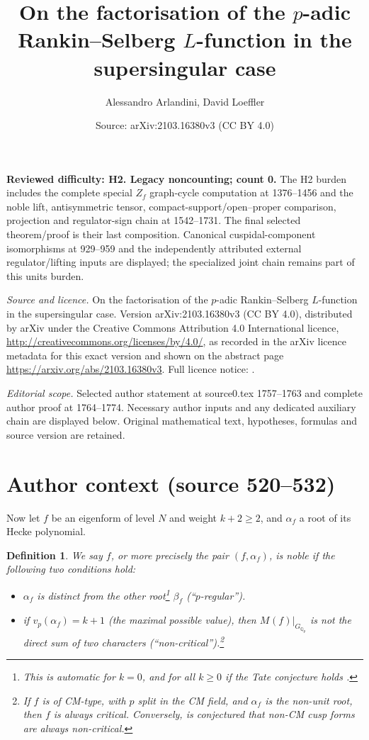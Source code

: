 \documentclass[10pt,a4paper]{amsart}
\title[Author proof 109730]{On the factorisation of the \texorpdfstring{$p$}{p}-adic Rankin--Selberg \texorpdfstring{$L$}{L}-function in the supersingular case}
\author{Alessandro Arlandini, David Loeffler}
\date{Source: arXiv:2103.16380v3 (CC BY 4.0)}
\newcommand{\Q}{\numberset{Q}}
\DeclareMathOperator{\et}{\acute{e}t}
\renewcommand{\ge}{\geqslant}
\newcommand{\numberset}{\mathbb}
\newtheorem{definition}{Definition}
\begin{document}
\maketitle
\noindent\textbf{Reviewed difficulty: H2. Legacy noncounting; count 0.} The H2 burden includes the complete special $Z_f$ graph-cycle computation at 1376--1456 and the noble lift, antisymmetric tensor, compact-support/open--proper comparison, projection and regulator-sign chain at 1542--1731. The final selected theorem/proof is their last composition. Canonical cuspidal-component isomorphisms at 929--959 and the independently attributed external regulator/lifting inputs are displayed; the specialized joint chain remains part of this unit\textquotesingle s burden.\par\medskip

\noindent\emph{Source and licence.} On the factorisation of the \texorpdfstring{$p$}{p}-adic Rankin--Selberg \texorpdfstring{$L$}{L}-function in the supersingular case. Version arXiv:2103.16380v3 (CC BY 4.0), distributed by arXiv under the Creative Commons Attribution 4.0 International licence, \url{http://creativecommons.org/licenses/by/4.0/}, as recorded in the arXiv licence metadata for this exact version and shown on the abstract page \url{https://arxiv.org/abs/2103.16380v3}. Full licence notice: .\par\smallskip


\noindent\textit{Editorial scope.} Selected author statement at source0.tex 1757--1763 and complete author proof at 1764--1774. Necessary author inputs and any dedicated auxiliary chain are displayed below. Original mathematical text, hypotheses, formulas and source version are retained.\par\smallskip
\section*{Author context (source 520--532)}
  Now let $f$ be an eigenform of level $N$ and weight $k + 2 \ge 2$, and $\alpha_f$ a root of its Hecke polynomial. 
  
  \begin{definition}
  \label{def:noble}
   We say $f$, or more precisely the pair $(f, \alpha_f)$, is \emph{noble} if the following two conditions hold:
   \begin{itemize}
   \item $\alpha_f$ is distinct from the other root\footnote{This is automatic for $k = 0$, and for all $k \ge 0$ if the Tate conjecture holds \cite{colemanedixhoven98}.} $\beta_f$ (``$p$-regular'').
   \item if $v_p(\alpha_f) = k + 1$ (the maximal possible value), then $M_{\et}(f)|_{G_{\Q_p}}$ is not the direct sum of two characters (``non-critical'').\footnote{If $f$ is of CM-type, with $p$ split in the CM field, and $\alpha_f$ is the non-unit root, then $f$ is always critical. Conversely, is conjectured that non-CM cusp forms are always non-critical.}
   \end{itemize}
  \end{definition}
\end{document}
